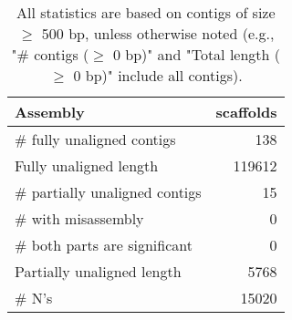 \documentclass[12pt,a4paper]{article}
\begin{document}
\begin{table}[ht]
\begin{center}
\caption{All statistics are based on contigs of size $\geq$ 500 bp, unless otherwise noted (e.g., "\# contigs ($\geq$ 0 bp)" and "Total length ($\geq$ 0 bp)" include all contigs).}
\begin{tabular}{|l*{1}{|r}|}
\hline
Assembly & scaffolds \\ \hline
\# fully unaligned contigs & 138 \\ \hline
Fully unaligned length & 119612 \\ \hline
\# partially unaligned contigs & 15 \\ \hline
\hspace{5mm}\# with misassembly & 0 \\ \hline
\hspace{5mm}\# both parts are significant & 0 \\ \hline
Partially unaligned length & 5768 \\ \hline
\# N's & 15020 \\ \hline
\end{tabular}
\end{center}
\end{table}
\end{document}
